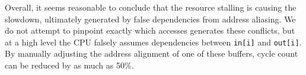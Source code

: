 \documentclass[10pt, conference, compsocconf]{IEEEtran}
\begin{document}
Overall, it seems reasonable to conclude that the resource stalling is causing the slowdown, ultimately generated by false dependencies from address aliasing.
We do not attempt to pinpoint exactly which accesses generates these conflicts, but at a high level the CPU falsely assumes dependencies between \texttt{in[i]} and \texttt{out[i]}.
By manually adjusting the address alignment of one of these buffers, cycle count can be reduced by as much as 50\%.


\end{document}
